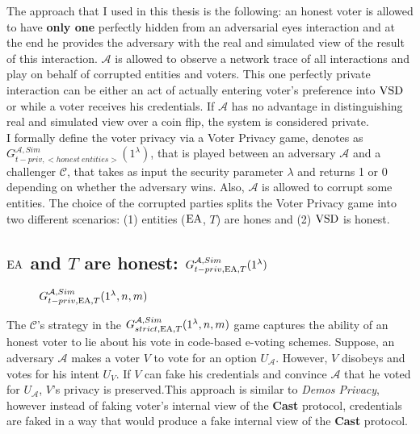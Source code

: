 The approach that I used in this thesis is the following: an honest voter is allowed to have  \textbf{only one} perfectly hidden from an adversarial eyes interaction and at the end he provides the adversary with the real and simulated view of the result of this interaction. $\mathcal{A}$ is allowed to observe a network trace of all interactions and play on behalf of corrupted entities and voters. This one perfectly private interaction can be either an act of actually entering voter's preference into $\operatorname{VSD}$ or while a voter receives his credentials. If $\mathcal{A}$  has no advantage in distinguishing real and simulated view over a coin flip, the system is considered private. \\

I formally define the voter privacy via a Voter Privacy game, denotes as $G_{t-priv,<honest~entities>}^{\mathcal{A}, Sim}(1^{\lambda})$, that is played between an adversary $\mathcal{A}$ and a challenger $\mathcal{C}$, that takes as input the security parameter $\lambda$ and returns 1 or 0 depending on whether the adversary wins.  Also, $\mathcal{A}$ is  allowed to corrupt some entities. The choice of the corrupted parties splits the Voter Privacy game into two different scenarios: (1) entities ($\operatorname{EA}$, $T$) are hones and (2) $\operatorname{VSD}$ is honest. \\

 \subsection{$\operatorname{EA}$ and $T$ are honest: $G_{t-priv,\operatorname{EA},T}^{\mathcal{A}, Sim}(1^{\lambda})$}
  \begin{figure}
 
        \caption{  $G_{t-priv,\operatorname{EA},T}^{\mathcal{A}, Sim}(1^{\lambda},n,m)$}
\end{figure}

The $\mathcal{C}$'s strategy  in the  $G_{strict,\operatorname{EA},T}^{\mathcal{A}, Sim}(1^{\lambda},n,m)$ game captures the ability of an honest voter to lie about his vote in code-based e-voting schemes. Suppose, an adversary $\mathcal{A}$ makes a voter $V$ to vote for an option $U_{\mathcal{A}}$.  However, $V$ disobeys and votes for his intent $U_{V}$. If $V$ can fake his credentials  and convince $\mathcal{A}$ that he voted for $U_{\mathcal{A}}$, $V$'s privacy is preserved.This approach is similar to \textit{Demos Privacy}, however instead of faking voter's internal view of the \textbf{Cast} protocol, credentials are faked in a way that would produce a fake internal view of the \textbf{Cast} protocol.\\

